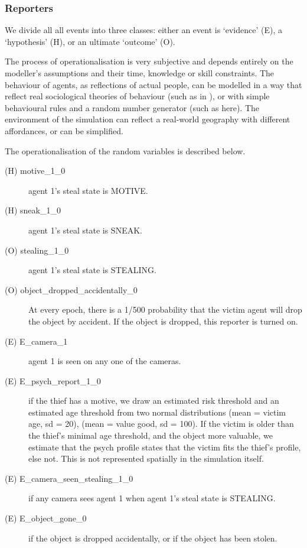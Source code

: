 \documentclass[12pt]{article}
\begin{document}
\subsubsection{Reporters}
We divide all all events into three classes: either an event is `evidence' (E), a `hypothesis' (H), or an ultimate `outcome' (O). 

The process of operationalisation is very subjective and depends entirely on the modeller's assumptions and their time, knowledge or skill constraints. The behaviour of agents, as reflections of actual people, can be modelled in a way that reflect real sociological theories of behaviour (such as in \citet{Gerritsen2015}), or with simple behavioural rules and a random number generator (such as here). The environment of the simulation can reflect a real-world geography with different affordances, or can be simplified. 

The operationalisation of the random variables is described below. 
\begin{description}
\item[(H) motive\_1\_0 ] agent 1's steal state is MOTIVE.
\item[(H) sneak\_1\_0 ] agent 1's steal state is SNEAK.
\item[(O) stealing\_1\_0 ] agent 1's steal state is STEALING.
\item[(O) object\_dropped\_accidentally\_0 ] At every epoch, there is a 1/500 probability that the victim agent will drop the object by accident. If the object is dropped, this reporter is turned on.
\item[(E) E\_camera\_1 ] agent 1 is seen on any one of the cameras.
\item[(E) E\_psych\_report\_1\_0 ] if the thief has a motive, we draw an estimated risk threshold and an estimated age threshold from two normal distributions (mean = victim age, sd = 20), (mean = value good, sd = 100). If the victim is older than the thief's minimal age threshold, and the object more valuable, we estimate that the psych profile states that the victim fits the thief's profile, else not. This is not represented spatially in the simulation itself.
\item[(E) E\_camera\_seen\_stealing\_1\_0 ]  if any camera sees agent 1 when agent 1's steal state is STEALING.
\item[(E) E\_object\_gone\_0 ] if the object is dropped accidentally, or if the object has been stolen.
\end{description}
\end{document}
